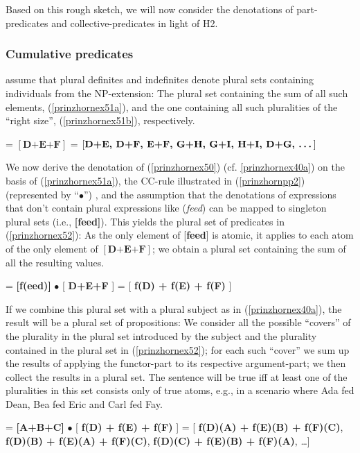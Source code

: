 \documentclass[output=paper]{langscibook}
\begin{document}
Based on this rough sketch, we will now consider the denotations of part-predicates and collective-predicates in light of H2.

\subsubsection{Cumulative predicates}\label{prinzhornsec:cum}\largerpage[2]
\citet{Haslinger:2018a, Haslinger:2018b} assume that plural definites and indefinites denote plural sets containing individuals from the NP-extension: The plural set containing the sum of all such elements, (\ref{prinzhornex51a}), and the one containing all such pluralities of the “right size”, (\ref{prinzhornex51b}), respectively.


\ea 
\ea {} = $[ \textbf{D+E+F} ]$\label{prinzhornex51a}
\ex {} = $[ \textbf{D+E, D+F, E+F, G+H, G+I, H+I, D+G,  \dots} ]$\label{prinzhornex51b}
\z\z

We now derive the denotation of (\ref{prinzhornex50}) (cf. \ref{prinzhornex40a}) on the basis of (\ref{prinzhornex51a}), the CC-rule illustrated in (\ref{prinzhornpp2}) (represented by “$\bullet$”) , and the assumption that the denotations of expressions that don't contain plural expressions like (\textit{feed}) can be mapped to singleton plural sets (i.e., \textbf{[feed]}). This yields the plural set of predicates in (\ref{prinzhornex52}): As the only element of [\textbf{feed}] is atomic, it applies to each atom of the only element of  $[ \textbf{D+E+F} ]$; we obtain a plural set containing the sum of all the resulting values. 

\ea {} = \textbf{[f(eed)]} $\bullet$ [ \textbf{D+E+F} ] =  [ \textbf{f(D) + f(E) + f(F)} ]\label{prinzhornex52}
\z

If we combine this plural set with a plural subject as in (\ref{prinzhornex40a}), the result will be a plural set of propositions: We consider all the possible “covers” of the plurality in the plural set introduced by the subject and the plurality contained in the plural set in (\ref{prinzhornex52}); for each such “cover” we sum up the results of applying the functor-part to its respective argument-part; we then collect the results in a plural set. The sentence will be true iff at least one of the pluralities in this set consists only of true atoms, e.g., in a scenario where Ada fed Dean, Bea fed Eric and Carl fed Fay.\largerpage

\ea {} = \textbf{[A+B+C]} $\bullet$  [ \textbf{f(D) + f(E) + f(F)} ] =  [ \textbf{f(D)(A) + f(E)(B) + f(F)(C)}, \textbf{f(D)(B) + f(E)(A) + f(F)(C)},  \textbf{f(D)(C) + f(E)(B) + f(F)(A)}, \dots ]
\label{prinzhornex53}
\z
\end{document}
